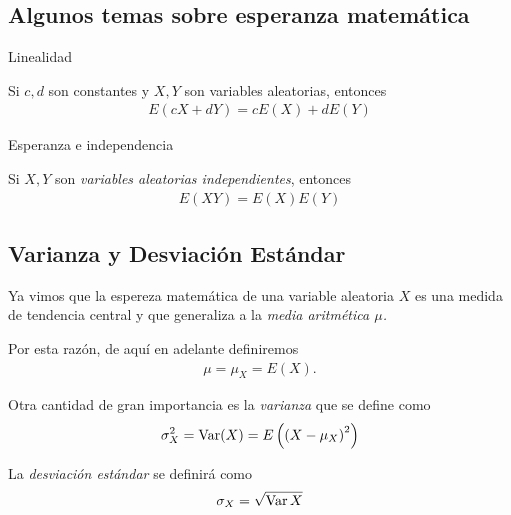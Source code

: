 \subsection{Algunos temas sobre esperanza matemática}
{Linealidad}
 \begin{teorema}
  \label{thm:3.1}
  Si $c,d$ son constantes y $X,Y$ son variables aleatorias, entonces
  \begin{align}
   \label{linealidad}
   E\left( cX+dY \right)=
   cE\left( X \right)+dE\left( Y \right)
  \end{align}

 \end{teorema}


{Esperanza e independencia}
 \begin{teorema}
  \label{thm:3.3} Si $X,Y$ son \emph{variables aleatorias independientes}, entonces
  \begin{align}
   \label{eq:3.10}
   E\left( XY \right)=E(X)E(Y)
  \end{align}

 \end{teorema}



\subsection{Varianza y Desviación Estándar}

 Ya vimos que la espereza matemática de una variable aleatoria $X$ es una medida de tendencia central y que generaliza a la \emph{media aritmética $\mu$.}
 

\begin{observacion}
 Por esta razón, de aquí en adelante definiremos
 \begin{align}
  \mu=\mu_{X}=E(X).
 \end{align}

\end{observacion}

 


 Otra cantidad de gran importancia es la \emph{varianza} que se define como
 \begin{align}
  \label{eq:3.11}
  \sigma_{X}^{2}=\operatorname{Var}(X)=E\left( \left( X-\mu_{X} \right)^{2} \right)
 \end{align}



 La \emph{desviación estándar} se definirá como
 \begin{align}
  \label{eq:3.12}
  \sigma_{X} = \sqrt{\operatorname{Var}{X}}
 \end{align}



